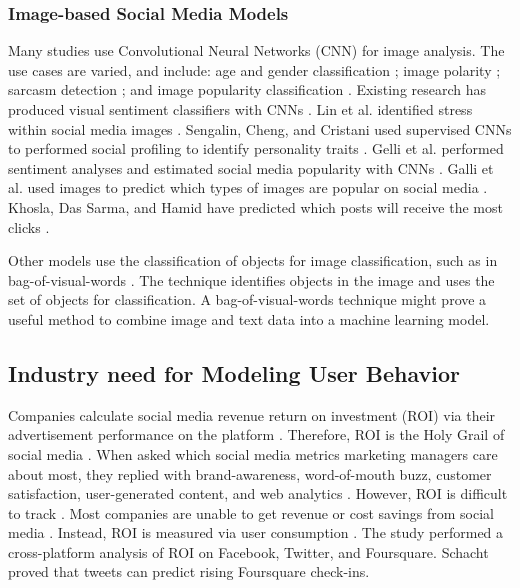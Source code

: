 \documentclass{article}
\begin{document}
\subsubsection{Image-based Social Media Models}
Many studies use Convolutional Neural Networks (CNN) for image analysis. The use cases are varied, and include: age and gender classification \cite{Hassner2015}; image polarity \cite{Poria2016}; sarcasm detection \cite{Poria2016}; and image popularity classification \cite{Khosla2014}. Existing research has produced visual sentiment classifiers with CNNs \cite{Segalin2017,Xu2014}. Lin et al. identified stress within social media images \cite{Lin2014}. Sengalin, Cheng, and Cristani used supervised CNNs to performed social profiling to identify personality traits \cite{Segalin2017}. Gelli et al. performed sentiment analyses and estimated social media popularity with CNNs \cite{Gelli2015}. Galli et al. used images to predict which types of images are popular on social media \cite{Gelli2015}.  Khosla, Das Sarma, and Hamid have predicted which posts will receive the most clicks \cite{Khosla2014}.  

Other models use the classification of objects for image classification, such as in bag-of-visual-words \cite{Mandhyani2017}. The technique identifies objects in the image and uses the set of objects for classification. A bag-of-visual-words technique might prove a useful method to combine image and text data into a machine learning model.

\subsection{Industry need for Modeling User Behavior}

Companies calculate social media revenue return on investment (ROI) via their advertisement performance on the platform \cite{fisher2009}. Therefore, ROI is the Holy Grail of social media \cite{Fisher2009}. When asked which social media metrics marketing managers care about most, they replied with brand-awareness, word-of-mouth buzz, customer satisfaction, user-generated content, and web analytics \cite{Tiago2014}. However, ROI is difficult to track \cite{schacht_hall_chorley_2015}. Most companies are unable to get revenue or cost savings from social media \cite{Romero2011}. Instead, ROI is measured via user consumption \cite{Schacht}. The study performed a cross-platform analysis of ROI on Facebook, Twitter, and Foursquare. Schacht proved that tweets can predict rising Foursquare check-ins.
\end{document}
